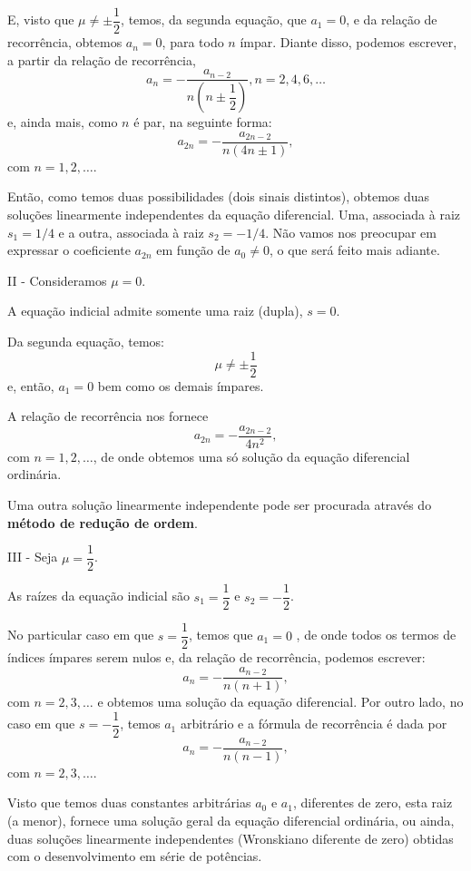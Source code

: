 {E, visto que $\mu \ne \pm\dfrac{1}{2}$, temos, da segunda equação, que $a_{1} = 0$, e da relação de recorrência, obtemos $a_n = 0$, para todo $n$ ímpar. Diante disso, podemos escrever, a partir da relação de recorrência,
$$a_n = -\dfrac{a_{n-2}}{n \left(n\pm \dfrac{1}{2}\right)}, n = 2, 4, 6, \ldots$$
e, ainda mais, como $n$ é par, na seguinte forma:
$$a_{2n} = -\dfrac{a_{2n-2}}{n(4n \pm 1)},$$
com $n = 1, 2, \ldots$.

Então, como temos duas possibilidades (dois sinais distintos), obtemos duas soluções linearmente independentes da equação diferencial. Uma, associada à raiz $s_1 = 1/4$ e a outra, associada à raiz $s_{2} = -1/4$. Não vamos nos preocupar em expressar o coeficiente $a_{2n}$ em função de $a_{0} \ne 0$, o que será feito mais adiante.

II - Consideramos $\mu = 0$.

A equação indicial admite somente uma raiz (dupla), $s = 0$.

Da segunda equação, temos:
$$\mu \ne \pm\dfrac{1}{2}$$
e, então, $a_{1} = 0$ bem como os demais ímpares.

A relação de recorrência nos fornece
$$a_{2n} = - \dfrac{a_{2n-2}}{4n^2},$$
com $n = 1, 2, \ldots$, de onde obtemos uma só solução da equação diferencial ordinária.

Uma outra solução linearmente independente pode ser procurada através do \textbf{método de redução de ordem}.

III - Seja $\mu = \dfrac{1}{2}$.

As raízes da equação indicial são $s_1 = \dfrac{1}{2}$
e $s_{2} = -\dfrac{1}{2}$.

No particular caso em que $s = \dfrac{1}{2}$, temos que $a_{1} = 0$ , de onde todos os termos de índices ímpares serem nulos e, da relação de recorrência, podemos escrever:
$$a_n = -\dfrac{a_{n-2}}{n(n+1)},$$
com $n = 2, 3, \ldots$ e obtemos uma solução da equação diferencial. 
Por outro lado, no caso em que $s = -\dfrac{1}{2}$, temos $a_{1}$ arbitrário e a fórmula de recorrência é dada por
$$a_n = -\dfrac{a_{n-2}}{n(n - 1)},$$
com $n = 2, 3, \ldots$.

Visto que temos duas constantes arbitrárias $a_{0}$ e $a_{1}$, diferentes de zero, esta raiz (a menor), fornece uma solução geral da equação diferencial ordinária, ou ainda, duas soluções linearmente independentes (Wronskiano diferente de zero) obtidas com o desenvolvimento em série de potências.


}
